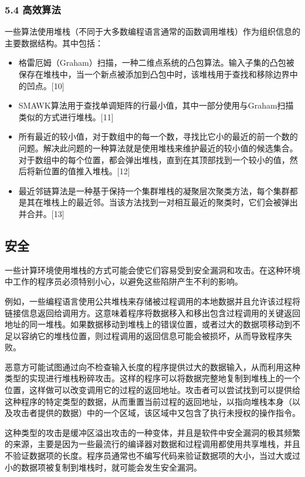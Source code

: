 \subsubsection{5.4 高效算法}
一些算法使用堆栈（不同于大多数编程语言通常的函数调用堆栈）作为组织信息的主要数据结构。其中包括：
\begin{itemize}
\item 格雷厄姆（Graham）扫描，一种二维点系统的凸包算法。输入子集的凸包被保存在堆栈中，当一个新点被添加到凸包中时，该堆栈用于查找和移除边界中的凹点。[10]
\item SMAWK算法用于查找单调矩阵的行最小值，其中一部分使用与Graham扫描类似的方式进行堆栈。[11]
\item 所有最近的较小值，对于数组中的每一个数，寻找比它小的最近的前一个数的问题。解决此问题的一种算法就是使用堆栈来维护最近的较小值的候选集合。对于数组中的每个位置，都会弹出堆栈，直到在其顶部找到一个较小的值，然后将新位置的值推入堆栈。[12]
\item 最近邻链算法是一种基于保持一个集群堆栈的凝聚层次聚类方法，每个集群都是其在堆栈上的最近邻。当该方法找到一对相互最近的聚类时，它们会被弹出并合并。[13]
\end{itemize}

\subsection{安全}
一些计算环境使用堆栈的方式可能会使它们容易受到安全漏洞和攻击。在这种环境中工作的程序员必须特别小心，以避免这些陷阱产生不利的影响。

例如，一些编程语言使用公共堆栈来存储被过程调用的本地数据并且允许该过程将链接信息返回给调用方。这意味着程序将数据移入和移出包含过程调用的关键返回地址的同一堆栈。如果数据移动到堆栈上的错误位置，或者过大的数据项移动到不足以容纳它的堆栈位置，则过程调用的返回信息可能会被损坏，从而导致程序失败。

恶意方可能试图通过向不检查输入长度的程序提供过大的数据输入，从而利用这种类型的实现进行堆栈粉碎攻击。这样的程序可以将数据完整地复制到堆栈上的一个位置，这样做可以改变调用它的过程的返回地址。攻击者可以尝试找到可以提供给这种程序的特定类型的数据，从而重置当前过程的返回地址，以指向堆栈本身（以及攻击者提供的数据）中的一个区域，该区域中又包含了执行未授权的操作指令。

这种类型的攻击是缓冲区溢出攻击的一种变体，并且是软件中安全漏洞的极其频繁的来源，主要是因为一些最流行的编译器对数据和过程调用都使用共享堆栈，并且不验证数据项的长度。程序员通常也不编写代码来验证数据项的大小，当过大或过小的数据项被复制到堆栈时，就可能会发生安全漏洞。

